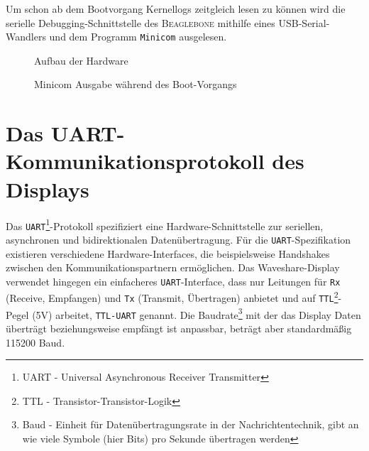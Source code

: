 Um schon ab dem Bootvorgang Kernellogs zeitgleich lesen zu können wird die serielle Debugging-Schnittstelle des \textsc{Beaglebone} mithilfe eines USB-Serial-Wandlers und dem Programm \texttt{Minicom} ausgelesen. 

\begin{figure}[H]
  \centering
  \caption{Aufbau der Hardware}
  \label{pic:hw_aufbau}
\end{figure}

\begin{figure}[H]
  \centering
  \caption{Minicom Ausgabe während des Boot-Vorgangs}
  \label{pic:minicom}
\end{figure}

\section{Das UART-Kommunikationsprotokoll des Displays}
Das \texttt{UART}\footnote{UART - Universal Asynchronous Receiver Transmitter}-Protokoll spezifiziert eine Hardware-Schnittstelle zur seriellen, asynchronen und bidirektionalen Datenübertragung. Für die \texttt{UART}-Spezifikation existieren verschiedene Hardware-Interfaces, die beispielsweise Handshakes zwischen den Kommunikationspartnern ermöglichen. Das Waveshare-Display verwendet hingegen ein einfacheres \texttt{UART}-Interface, dass nur Leitungen für \texttt{Rx} (Receive, Empfangen) und \texttt{Tx} (Transmit, Übertragen) anbietet und auf \texttt{TTL}\footnote{TTL - Transistor-Transistor-Logik}-Pegel (5V) arbeitet, \texttt{TTL-UART} genannt. Die Baudrate\footnote{Baud - Einheit für Datenübertragungsrate in der Nachrichtentechnik, gibt an wie viele Symbole (hier Bits) pro Sekunde übertragen werden} mit der das Display Daten überträgt beziehungsweise empfängt ist anpassbar, beträgt aber standardmäßig 115200 Baud. 
\newline


